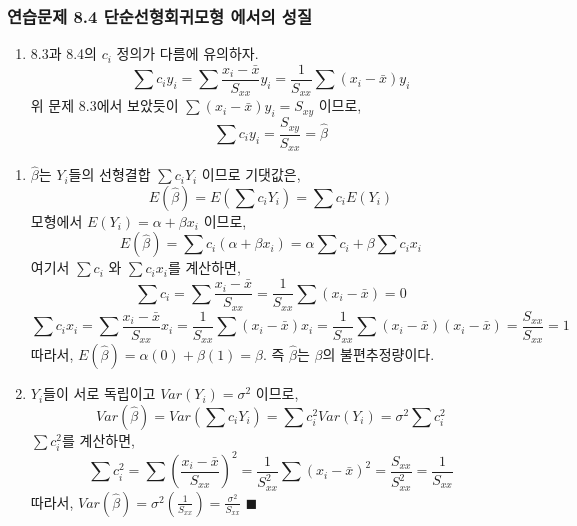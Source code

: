 \documentclass[11pt, a4paper]{article}
\newcommand\dis{\displaystyle}
\begin{document}
\subsubsection*{연습문제 8.4 단순선형회귀모형 에서의 성질}
\begin{enumerate}[label=(\alph*)]
    \item 8.3과 8.4의 \(c_i\) 정의가 다름에 유의하자.
    \[ \sum c_i y_i = \sum \frac{x_i - \bar{x}}{S_{xx}} y_i = \frac{1}{S_{xx}} \sum (x_i-\bar{x})y_i \]
    위 문제 8.3에서 보았듯이 \(\sum(x_i-\bar{x})y_i = S_{xy}\) 이므로,
    \[ \sum c_i y_i = \frac{S_{xy}}{S_{xx}} = \hat{\beta} \]
\end{enumerate}

\begin{enumerate}[label=(\alph*), start=3]
    \item
    \(\hat{\beta}\)는 \(Y_i\)들의 선형결합 \(\sum c_i Y_i\) 이므로 기댓값은,
    \[ E(\hat{\beta}) = E\left(\sum c_i Y_i\right) = \sum c_i E(Y_i) \]
    모형에서 \(E(Y_i) = \alpha + \beta x_i\) 이므로,
    \[ E(\hat{\beta}) = \sum c_i (\alpha + \beta x_i) = \alpha \sum c_i + \beta \sum c_i x_i \]
    여기서 \(\sum c_i\) 와 \(\sum c_i x_i\)를 계산하면,
    \[ \sum c_i = \sum \frac{x_i - \bar{x}}{S_{xx}} = \frac{1}{S_{xx}} \sum(x_i - \bar{x}) = 0 \]
    \[ \sum c_i x_i = \sum \frac{x_i - \bar{x}}{S_{xx}} x_i = \frac{1}{S_{xx}} \sum (x_i - \bar{x})x_i = \frac{1}{S_{xx}} \sum (x_i - \bar{x})(x_i - \bar{x}) = \frac{S_{xx}}{S_{xx}} = 1 \]
    따라서, \(E(\hat{\beta}) = \alpha(0) + \beta(1) = \beta\). 즉 \(\hat{\beta}\)는 \(\beta\)의 불편추정량이다.

    \item
    \(Y_i\)들이 서로 독립이고 \(Var(Y_i) = \sigma^2\) 이므로,
    \[ Var(\hat{\beta}) = Var\left(\sum c_i Y_i\right) = \sum c_i^2 Var(Y_i) = \sigma^2 \sum c_i^2 \]
    \(\sum c_i^2\)를 계산하면,
    \[ \sum c_i^2 = \sum \left(\frac{x_i - \bar{x}}{S_{xx}}\right)^2 = \frac{1}{S_{xx}^2} \sum(x_i - \bar{x})^2 = \frac{S_{xx}}{S_{xx}^2} = \frac{1}{S_{xx}} \]
    따라서, \(\dis Var(\hat{\beta}) = \sigma^2 \left(\frac{1}{S_{xx}}\right) = \frac{\sigma^2}{S_{xx}}\) \hfill $\blacksquare$
\end{enumerate}
\end{document}
